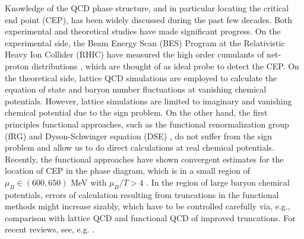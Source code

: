 \documentclass[%
reprint,
superscriptaddress,
preprintnumbers,
amsmath,amssymb,
aps,
prd,
]{revtex4-2}
\begin{document}
Knowledge of the QCD phase structure, and in particular locating the critical end point (CEP), has been widely discussed during the past few decades. Both experimental and theoretical studies have made significant progress. On the experimental side, the Beam Energy Scan (BES) Program at the Relativistic Heavy Ion Collider (RHIC) have measured the high order cumulants of net-proton distributions \cite{STAR:2020tga, STAR:2021iop, STAR:2021rls, STAR:2021fge, Pandav:2020uzx}, which are thought of as ideal probe to detect the CEP. On the theoretical side, lattice QCD simulations are employed to calculate the equation of state \cite{Bazavov:2009zn, Bazavov:2014pvz, Borsanyi:2013bia} and baryon number fluctuations \cite{HotQCD:2017qwq, Borsanyi:2018grb, Bazavov:2020bjn, Borsanyi:2023wno, Bollweg:2021vqf} at vanishing chemical potentials. However, lattice simulations are limited to imaginary and vanishing chemical potential due to the sign problem. On the other hand, the first principles functional approaches, such as the functional renormalization group (fRG) \cite{Fu:2019hdw, Braun:2020ada, Mitter:2014wpa, Cyrol:2017ewj, Braun:2014ata} and Dyson-Schwinger equation (DSE) \cite{Gao:2020fbl, Bernhardt:2021iql, Isserstedt:2019pgx, Lu:2023mkn}, do not suffer from the sign problem and allow us to do direct calculations at real chemical potentials. Recently, the functional approaches have shown convergent estimates for the location of CEP in the phase diagram, which is in a small region of  $ \mu_B \in (600,650) $ MeV with $\mu_B/T>4$ \cite{Fu:2019hdw, Gao:2020fbl, Isserstedt:2019pgx}. In the region of large baryon chemical potentials, errors of calculation resulting from truncations in the functional methods might increase sizably, which have to be controlled carefully via, e.g., comparison with lattice QCD and functional QCD of improved truncations. For recent reviews, see, e.g.  \cite{Guenther:2022wcr, Guenther:2020jwe, Dupuis:2020fhh, Rennecke:2019lus, Fu:2022gou}.
\end{document}

